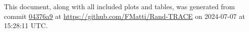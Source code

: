 This document, along with all included plots and tables, was generated from commit \href{https://github.com/FMatti/Rand-TRACE/tree/04376a9}{04376a9} at \url{https://github.com/FMatti/Rand-TRACE} on 2024-07-07 at 15:28:11 UTC.
